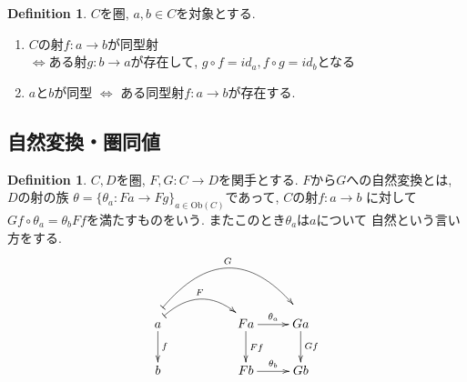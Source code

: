\documentclass[a4paper,10pt]{article}
\theoremstyle{definition}
\newtheorem{definition}[thm]{\bfseries Definition}
\begin{document}
\begin{definition}
    $C$を圏, $a,b \in C$を対象とする.
    \begin{enumerate}[(1)]
        \item $C$の射$f:a \rightarrow b$が同型射\\
        $\Leftrightarrow$ある射$g:b \rightarrow a$が存在して, $g \circ f = id_a, f \circ g = id_b$となる
        \item $a$と$b$が同型 $\Leftrightarrow$ ある同型射$f:a \rightarrow b$が存在する.
    \end{enumerate}
\end{definition}
\subsection{自然変換・圏同値}
\begin{definition}
    $C,D$を圏, $F,G:C \rightarrow D$を関手とする. $F$から$G$への自然変換とは, $D$の射の族
    $\theta=\{\theta_a: Fa \rightarrow Fg\}_{a\in \mathrm{Ob}(C)}$であって, $C$の射$f:a \rightarrow b$
    に対して$Gf \circ \theta_a = \theta_b Ff$を満たすものをいう. またこのとき$\theta_a$は$a$について
    自然という言い方をする.
    \begin{align*}
\xymatrix{
a\ar@{|->}@/^18pt/@<0.5ex>[rr]^-{F} \ar[d]^-{f} 
\ar@{|->}@/^36pt/@<2.0ex>[rrr]^-{G}& & 
Fa\ar[r]^-{\theta_a} \ar[d]^{Ff}& Ga \ar[d]^-{Gf} \\
b& 
& Fb\ar[r]^-{\theta_b}& Gb
}
    \end{align*}
\end{definition}
\end{document}

